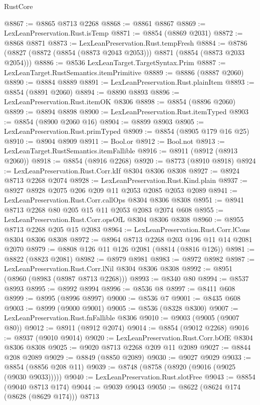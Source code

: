 \begin{lexlean}{RustCore}
\begin{coremodule}
@8867 := @8865 @8713 @2268
@8868 := @8861 @8867
@8869 := LexLeanPreservation.Rust.isTemp
@8871 := @8854 (@8869 @2031)
@8872 := @8868 @8871
@8873 := LexLeanPreservation.Rust.tempFresh
@8884 := @8786 (@8827 (@8872 (@8854 (@8873 @2043 @2053))) @8871 (@8854 (@8873 @2033 @2054)))
@8886 := @8536 LexLeanTarget.TargetSyntax.Prim
@8887 := LexLeanTarget.RustSemantics.itemPrimitive
@8889 := @8886 (@8887 @2060)
@8890 := @8884 @8889
@8891 := LexLeanPreservation.Rust.plainItem
@8893 := @8854 (@8891 @2060)
@8894 := @8890 @8893
@8896 := LexLeanPreservation.Rust.itemOK @8306
@8898 := @8854 (@8896 @2060)
@8899 := @8894 @8898
@8900 := LexLeanPreservation.Rust.itemTyped
@8903 := @8854 (@8900 @2060 @16)
@8904 := @8899 @8903
@8905 := LexLeanPreservation.Rust.primTyped
@8909 := @8854 (@8905 @179 @16 @25)
@8910 := @8904 @8909
@8911 := Bool.or
@8912 := Bool.not
@8913 := LexLeanTarget.RustSemantics.itemFallible
@8916 := @8911 (@8912 (@8913 @2060))
@8918 := @8854 (@8916 @2268)
@8920 := @8773 (@8910 @8918)
@8924 := LexLeanPreservation.Rust.Corr.kIf @8304 @8306 @8308
@8927 := @8924 @8713 @2268 @2074
@8928 := LexLeanPreservation.Rust.Kind.plain
@8937 := @8927 @8928 @2075 @206 @209 @11 @2053 @2085 @2053 @2089
@8941 := LexLeanPreservation.Rust.Corr.callOps @8304 @8306 @8308
@8951 := @8941 @8713 @2268 @80 @205 @15 @11 @2053 @2083 @2074 @608
@8955 := LexLeanPreservation.Rust.Corr.opsOfL @8304 @8306 @8308
@8960 := @8955 @8713 @2268 @205 @15 @2083
@8964 := LexLeanPreservation.Rust.Corr.lCons @8304 @8306 @8308
@8972 := @8964 @8713 @2268 @203 @196 @11 @14 @2081 @2070
@8979 := @8808 @126 @11 @126 @2081 (@8814 (@8816 @126))
@8981 := @8822 (@8823 @2081)
@8982 := @8979 @8981
@8983 := @8972 @8982
@8987 := LexLeanPreservation.Rust.Corr.lNil @8304 @8306 @8308
@8992 := @8951 (@8960 (@8983 (@8987 @8713 @2268)))
@8993 := @8340 @80
@8994 := @8537 @8993
@8995 := @8992 @8994
@8996 := @8536 @8
@8997 := @8411 @608
@8999 := @8995 (@8996 @8997)
@9000 := @8536 @7
@9001 := @8435 @608
@9003 := @8999 (@9000 @9001)
@9005 := @8536 (@8328 @8300)
@9007 := LexLeanPreservation.Rust.fnFallible @8306
@9010 := @9003 (@9005 (@9007 @80))
@9012 := @8911 (@8912 @2074)
@9014 := @8854 (@9012 @2268)
@9016 := @8937 (@9010 @9014)
@9020 := LexLeanPreservation.Rust.Corr.bOfE @8304 @8306 @8308
@9025 := @9020 @8713 @2268 @209 @11 @2089
@9027 := @8844 @208 @2089
@9029 := @8849 (@8850 @2089)
@9030 := @9027 @9029
@9033 := @8854 (@8856 @208 @11)
@9039 := @8748 (@8758 (@8920 (@9016 (@9025 (@9030 @9033)))))
@9040 := LexLeanPreservation.Rust.slotFree
@9043 := @8854 (@9040 @8713 @174)
@9044 := @9039 @9043
@9050 := @8622 (@8624 @174 (@8628 (@8629 @174))) @8713

\end{coremodule}
\end{lexlean}
